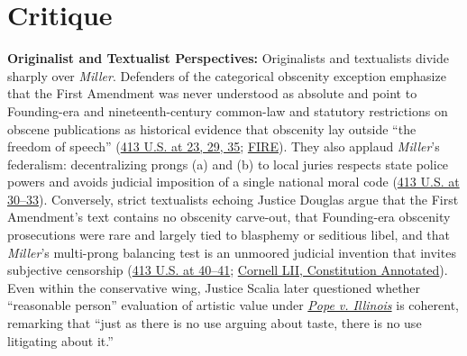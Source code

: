 \documentclass[12pt]{article}
\begin{document}
\section{Critique}
\textbf{Originalist and Textualist Perspectives:} Originalists and textualists divide sharply over \textit{Miller}. Defenders of the categorical obscenity exception emphasize that the First Amendment was never understood as absolute and point to Founding-era and nineteenth-century common-law and statutory restrictions on obscene publications as historical evidence that obscenity lay outside ``the freedom of speech'' (\href{https://supreme.justia.com/cases/federal/us/413/15/}{413 U.S. at 23, 29, 35}; \href{https://www.fire.org/research-learn/obscenity-exception-first-amendment}{FIRE}). They also applaud \textit{Miller}'s federalism: decentralizing prongs (a) and (b) to local juries respects state police powers and avoids judicial imposition of a single national moral code (\href{https://supreme.justia.com/cases/federal/us/413/15/}{413 U.S. at 30--33}). Conversely, strict textualists echoing Justice Douglas argue that the First Amendment's text contains no obscenity carve-out, that Founding-era obscenity prosecutions were rare and largely tied to blasphemy or seditious libel, and that \textit{Miller}'s multi-prong balancing test is an unmoored judicial invention that invites subjective censorship (\href{https://supreme.justia.com/cases/federal/us/413/15/}{413 U.S. at 40--41}; \href{https://www.law.cornell.edu/constitution-conan/amendment-1/overview-of-obscene-speech}{Cornell LII, Constitution Annotated}). Even within the conservative wing, Justice Scalia later questioned whether ``reasonable person'' evaluation of artistic value under \href{https://supreme.justia.com/cases/federal/us/481/497/}{\textit{Pope v. Illinois}} is coherent, remarking that ``just as there is no use arguing about taste, there is no use litigating about it.''
\end{document}
